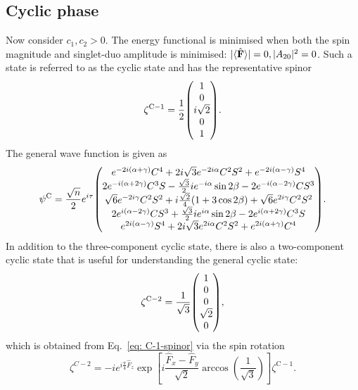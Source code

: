 \subsection{Cyclic phase}
Now consider \(c_1, c_2 > 0\).
The energy functional is minimised when both the spin magnitude and singlet-duo
amplitude is minimised: \(|\langle \hat{\vb{F}} \rangle | = 0, |A_{20}|^2=0\).
Such a state is referred to as the cyclic state and has the representative
spinor
\begin{equation}
    \zeta^\mathrm{C-1} = \frac{1}{2}\mqty(1 \\ 0 \\ i\sqrt{2} \\ 0 \\ 1).
    \label{eq: C-1-spinor}
\end{equation}
The general wave function is given as
\begin{equation}\label{eq: general-cyclic-wfn}
    \psi^\mathrm{C} = \frac{\sqrt{n}}{2}e^{i\tau} \mqty(
    e^{-2i(\alpha+\gamma)}C^4 + 2i\sqrt{3}e^{-2i\alpha}C^2S^2
    + e^{-2i(\alpha-\gamma)}S^4
    \\
    2e^{-i(\alpha+2\gamma)}C^3S - \frac{\sqrt{3}}{2}ie^{-i\alpha}\sin 2\beta
    - 2e^{-i(\alpha-2\gamma)}CS^3
    \\
    \sqrt{6}e^{-2i\gamma}C^2S^2 + i\frac{\sqrt{2}}{4}(1+3\cos 2\beta)
    + \sqrt{6}e^{2i\gamma}C^2S^2
    \\
    2e^{i(\alpha-2\gamma)}CS^3 + \frac{\sqrt{3}}{2}ie^{i\alpha}\sin 2\beta
    - 2e^{i(\alpha+2\gamma)}C^3S
    \\
    e^{2i(\alpha-\gamma)}S^4 + 2i\sqrt{3}e^{2i\alpha}C^2S^2
    + e^{2i(\alpha+\gamma)}C^4
    ).
\end{equation}
In addition to the three-component cyclic state, there is also a two-component
cyclic state that is useful for understanding the general cyclic state:
\begin{equation}
    \zeta^\mathrm{C-2} = \frac{1}{\sqrt{3}}\mqty(1  \\ 0 \\ 0 \\ \sqrt{2} \\ 0),
    \label{eq: C-2-spinor}
\end{equation}
which is obtained from Eq.~\eqref{eq: C-1-spinor} via the spin
rotation~\cite{Kawaguchi2012}
\begin{equation}
    \zeta^{C-2} = -ie^{i\frac{\pi}{4}\hat{F}_z}
    \exp\left[i\frac{\hat{F}_x-\hat{F}_y}{\sqrt{2}}
        \arccos{\left(\frac{1}{\sqrt{3}}\right)}\right]\zeta^\mathrm{C-1}.
\end{equation}
